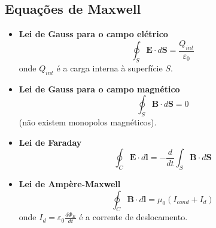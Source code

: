 \documentclass{article}
\begin{document}
\subsection{Equações de Maxwell}

\begin{itemize}
    \item [(a)] \textbf{Lei de Gauss para o campo elétrico}
        \begin{equation}
            \boxed{\oint_{S} \mathbf{E}\cdot d\mathbf{S} = \frac{Q_{int}}{\varepsilon_0}}
        \end{equation} onde \(Q_{int}\) é a carga interna à superfície \(S\).

    \item [(b)] \textbf{Lei de Gauss para o campo magnético}
        \begin{equation}
            \boxed{\oint_{S} \mathbf{B} \cdot d\mathbf{S} = 0}
        \end{equation} (não existem monopolos magnéticos).
    \item [(c)] \textbf{Lei de Faraday}
        \begin{equation}
            \boxed{\oint_{C} \mathbf{E} \cdot d\mathbf{l} = -\frac{d}{dt}\int_{S} \mathbf{B} \cdot d\mathbf{S}}
        \end{equation}
    \item [(d)] \textbf{Lei de Ampère-Maxwell}
        \begin{equation}
            \boxed{\oint_{C} \mathbf{B} \cdot d\mathbf{l} = \mu_0 \left( I_{cond} + I_{d} \right)}
        \end{equation} onde \(\displaystyle I_{d} = \varepsilon_0 \frac{d\Phi_E}{dt}\) é a corrente de deslocamento.
\end{itemize}
\end{document}
